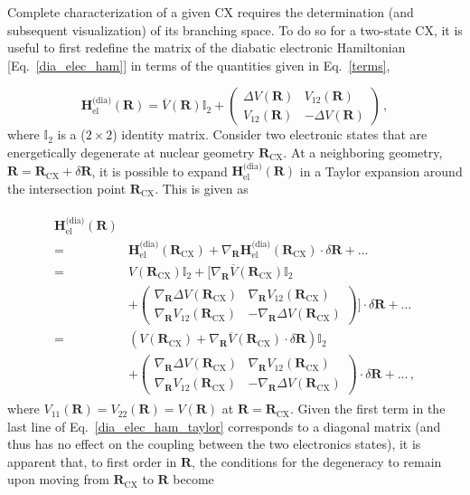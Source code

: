 \documentclass[9pt,bestpractices,pubversion]{livecoms}
\newcommand{\R}{\mathbf{R}}
\begin{document}
Complete characterization of a given CX requires the determination (and subsequent visualization) of its branching space. 
To do so for a two-state CX, it is useful to first redefine the matrix of the diabatic electronic Hamiltonian [Eq.~\eqref{dia_elec_ham}] in terms of the quantities given in Eq.~\eqref{terms},\cite{domcke_conical_2004, ferre_description_2015}

\begin{equation}
\label{dia_elec_ham_redefine}
    \mathbf{H}_{\text{el}}^{\text{(dia)}}(\R) = \overline{V}(\R)\mathbb{I}_2 + 
    \begin{pmatrix}
        \Delta V(\R) & V_{12}(\R) \\
        V_{12}(\R) & -\Delta V(\R)
    \end{pmatrix} \, ,
\end{equation}
where $\mathbb{I}_2$ is a ($2 \times 2$) identity matrix.
Consider two electronic states that are energetically degenerate at nuclear geometry $\R_\text{CX}$.
At a neighboring geometry, $\R = \R_\text{CX} + \delta\R$, it is possible to expand $\mathbf{H}_{\text{el}}^{\text{(dia)}}(\R)$ in a Taylor expansion around the intersection point $\R_\text{CX}$. This is given as

\begin{align}
\label{dia_elec_ham_taylor}
\begin{split}
    \mathbf{H}_{\text{el}}^{\text{(dia)}}(\R) & \\ 
    =& \mathbf{H}_{\text{el}}^{\text{(dia)}}(\R_{\text{CX}}) + \nabla_{\R} \mathbf{H}_{\text{el}}^{\text{(dia)}}(\R_{\text{CX}}) \cdot \delta\R + \dots \\
    =& V(\R_{\text{CX}})\mathbb{I}_2 + \Bigg[\nabla_{\R} \overline{V}(\R_{\text{CX}})\mathbb{I}_2 \\ 
    & + 
    \begin{pmatrix}
        \nabla_{\R} \Delta V(\R_{\text{CX}}) & \nabla_{\R} V_{12}(\R_{\text{CX}}) \\
        \nabla_{\R} V_{12}(\R_{\text{CX}}) & -\nabla_{\R} \Delta V(\R_{\text{CX}})
    \end{pmatrix}
    \Bigg] \cdot \delta \R + \dots \\
    =& \left(V(\R_{\text{CX}})  + \nabla_{\R} \overline{V}(\R_{\text{CX}}) \cdot \delta\R \right) \mathbb{I}_2 \\ 
    &+ 
    \begin{pmatrix}
        \nabla_{\R} \Delta V(\R_{\text{CX}}) & \nabla_{\R} V_{12}(\R_{\text{CX}}) \\
        \nabla_{\R} V_{12}(\R_{\text{CX}}) & -\nabla_{\R} \Delta V(\R_{\text{CX}})
    \end{pmatrix}
   \cdot \delta \R + \dots \, ,
\end{split}
\end{align}
where $V_{11}(\R) = V_{22}(\R) = V(\R)$ at $\R = \R_{\text{CX}}$.\cite{sicilia2007quadratic}
Given the first term in the last line of Eq.~\eqref{dia_elec_ham_taylor} corresponds to a diagonal matrix (and thus has no effect on the coupling between the two electronics states), it is apparent that, to first order in $\R$, the conditions for the degeneracy to remain upon moving from $\R_{\text{CX}}$ to $\R$ become 
\end{document}
